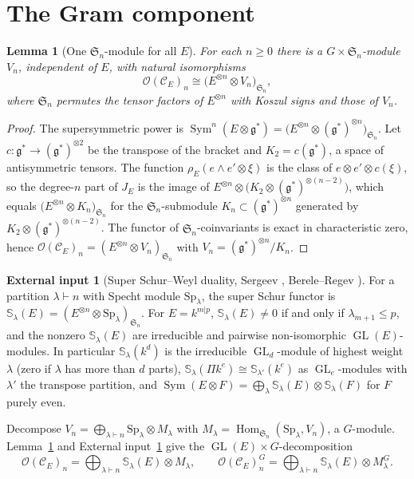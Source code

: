 \documentclass[11pt]{article}
\newtheorem{lemma}[theorem]{Lemma}
\theoremstyle{definition}
\newtheorem{inputthm}[theorem]{External input}
\newcommand{\g}{\mathfrak g}
\newcommand{\Cs}{\mathcal C}
\newcommand{\Oo}{\mathcal O}
\newcommand{\Sf}{\mathbb S}
\newcommand{\Sg}{\mathfrak S}
\DeclareMathOperator{\Sym}{Sym}
\DeclareMathOperator{\Hom}{Hom}
\DeclareMathOperator{\GL}{GL}
\begin{document}
\section{The Gram component}\label{sec:gram}

\begin{lemma}[One $\Sg_n$-module for all $E$]\label{lem:polyfun}
For each $n\ge0$ there is a $G\times\Sg_n$-module $V_n$, independent of $E$, with natural isomorphisms
\[
\Oo(\Cs_E)_n\cong\bigl(E^{\otimes n}\otimes V_n\bigr)_{\Sg_n},
\]
where $\Sg_n$ permutes the tensor factors of $E^{\otimes n}$ with Koszul signs and those of $V_n$.
\end{lemma}
\begin{proof}
The supersymmetric power is $\Sym^n(E\otimes\g^*)=\bigl(E^{\otimes n}\otimes(\g^*)^{\otimes n}\bigr)_{\Sg_n}$. Let $c:\g^*\to(\g^*)^{\otimes2}$ be the transpose of the bracket and $K_2=c(\g^*)$, a space of antisymmetric tensors. The function $\rho_E(e\wedge e'\otimes\xi)$ is the class of $e\otimes e'\otimes c(\xi)$, so the degree-$n$ part of $J_E$ is the image of $E^{\otimes n}\otimes\bigl(K_2\otimes(\g^*)^{\otimes(n-2)}\bigr)$, which equals $\bigl(E^{\otimes n}\otimes K_n\bigr)_{\Sg_n}$ for the $\Sg_n$-submodule $K_n\subset(\g^*)^{\otimes n}$ generated by $K_2\otimes(\g^*)^{\otimes(n-2)}$. The functor of $\Sg_n$-coinvariants is exact in characteristic zero, hence $\Oo(\Cs_E)_n=(E^{\otimes n}\otimes V_n)_{\Sg_n}$ with $V_n=(\g^*)^{\otimes n}/K_n$.
\end{proof}

\begin{inputthm}[{Super Schur--Weyl duality, Sergeev \cite{Se85}, Berele--Regev \cite{BR87}}]\label{in:schur}
For a partition $\lambda\vdash n$ with Specht module $\mathrm{Sp}_\lambda$, the super Schur functor is $\Sf_\lambda(E)=(E^{\otimes n}\otimes\mathrm{Sp}_\lambda)_{\Sg_n}$. For $E=k^{m|p}$, $\Sf_\lambda(E)\neq0$ if and only if $\lambda_{m+1}\le p$, and the nonzero $\Sf_\lambda(E)$ are irreducible and pairwise non-isomorphic $\GL(E)$-modules. In particular $\Sf_\lambda(k^d)$ is the irreducible $\GL_d$-module of highest weight $\lambda$ (zero if $\lambda$ has more than $d$ parts), $\Sf_\lambda(\Pi k^e)\cong\Sf_{\lambda'}(k^e)$ as $\GL_e$-modules with $\lambda'$ the transpose partition, and $\Sym(E\otimes F)=\bigoplus_\lambda\Sf_\lambda(E)\otimes\Sf_\lambda(F)$ for $F$ purely even.
\end{inputthm}

Decompose $V_n=\bigoplus_{\lambda\vdash n}\mathrm{Sp}_\lambda\otimes M_\lambda$ with $M_\lambda=\Hom_{\Sg_n}(\mathrm{Sp}_\lambda,V_n)$, a $G$-module. Lemma~\ref{lem:polyfun} and External input~\ref{in:schur} give the $\GL(E)\times G$-decomposition
\begin{equation}\label{eq:decomp}
\Oo(\Cs_E)_n=\bigoplus_{\lambda\vdash n}\Sf_\lambda(E)\otimes M_\lambda,\qquad \Oo(\Cs_E)^G_n=\bigoplus_{\lambda\vdash n}\Sf_\lambda(E)\otimes M^G_\lambda .
\end{equation}
\end{document}
